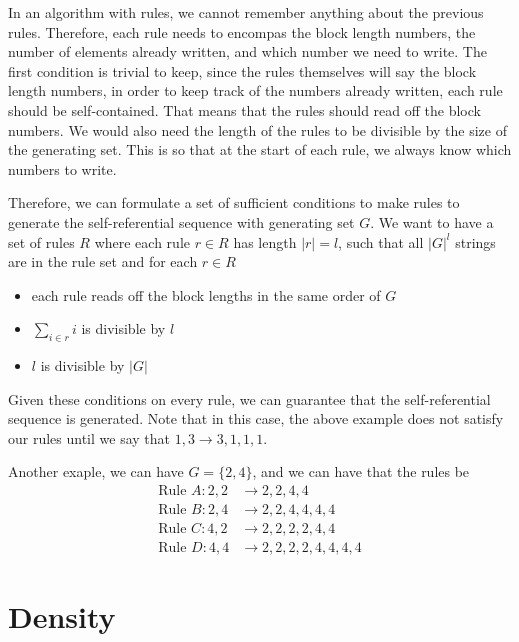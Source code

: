 \documentclass[runningheads,a4paper]{llncs}
\begin{document}
In an algorithm with rules, we cannot remember anything about the previous rules. Therefore, each rule needs to encompas the block length numbers, the number of elements already written, and which number we need to write. The first condition is trivial to keep, since the rules themselves will say the block length numbers, in order to keep track of the numbers already written, each rule should be self-contained. That means that the rules should read off the block numbers. We would also need the length of the rules to be divisible by the size of the generating set. This is so that at the start of each rule, we always know which numbers to write.

Therefore, we can formulate a set of sufficient conditions to make rules to generate the self-referential sequence with generating set $G$. We want to have a set of rules $R$ where each rule $r \in R$ has length $|r| = l$, such that all $|G|^{l}$ strings are in the rule set and for each $r \in R$
\begin{itemize}
\item each rule reads off the block lengths in the same order of $G$
\item $\sum_{i \in r} i$ is divisible by $l$
\item $l$ is divisible by $|G|$
\end{itemize}
Given these conditions on every rule, we can guarantee that the self-referential sequence is generated. Note that in this case, the above example does not satisfy our rules until we say that $1, 3 \to 3, 1, 1, 1$.

Another exaple, we can have $G = \{ 2, 4 \}$, and we can have that the rules be
\begin{align*}
\text{Rule }A: 2,2 &\to 2, 2, 4, 4 \\
\text{Rule }B: 2,4 &\to 2, 2, 4,4,4,4\\
\text{Rule }C: 4,2 &\to 2,2,2,2,4,4\\
\text{Rule }D: 4,4 &\to 2, 2, 2, 2, 4, 4, 4, 4
\end{align*}

\section{Density}
\label{density}
\end{document}
